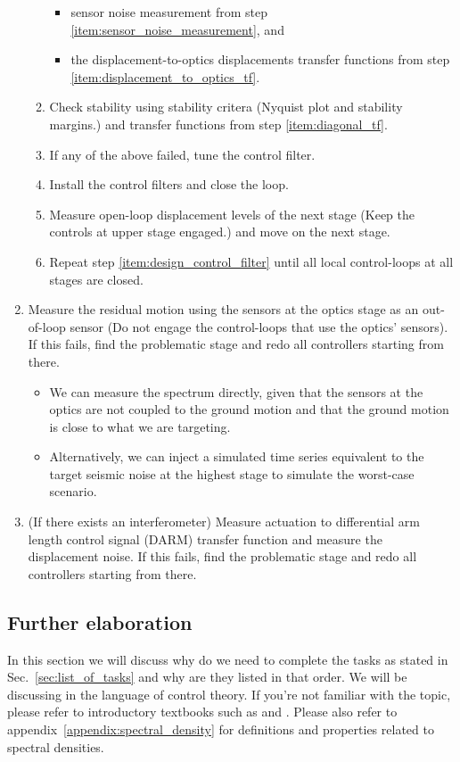 \begin{enumerate}
\begin{enumerate}
\begin{itemize}
			\item sensor noise measurement from step \ref{item:sensor_noise_measurement}, and
			\item the displacement-to-optics displacements transfer functions from step \ref{item:displacement_to_optics_tf}.
		\end{itemize} 
		\item Check stability using stability critera (Nyquist plot and stability margins.) and transfer functions from step \ref{item:diagonal_tf}.
		\item If any of the above failed, tune the control filter.
		\item Install the control filters and close the loop.
		\item Measure open-loop displacement levels of the next stage (Keep the controls at upper stage engaged.) and move on the next stage. \label{item:open_loop_displacement_levels}
		\item Repeat step \ref{item:design_control_filter} until all local control-loops at all stages are closed.
	\end{enumerate}
	\item Measure the residual motion using the sensors at the optics stage as an out-of-loop sensor (Do not engage the control-loops that use the optics' sensors). If this fails, find the problematic stage and redo all controllers starting from there.
		\begin{itemize}
			\item We can measure the spectrum directly, given that the sensors at the optics are not coupled to the ground motion and that the ground motion is close to what we are targeting.
			\item Alternatively, we can inject a simulated time series equivalent to the target seismic noise at the highest stage to simulate the worst-case scenario.
		\end{itemize}
	\item (If there exists an interferometer) Measure actuation to differential arm length control signal (DARM) transfer function and measure the displacement noise. If this fails, find the problematic stage and redo all controllers starting from there.
\end{enumerate}

\subsection{Further elaboration \label{sec:suspension_commissioning_tasks_further_elaboration}}
In this section we will discuss why do we need to complete the tasks as stated in Sec.~\ref{sec:list_of_tasks} and why are they listed in that order.
We will be discussing in the language of control theory.
If you're not familiar with the topic, please refer to introductory textbooks such as \cite{modern_control_engineering} and \cite{control_engineering}. Please also refer to appendix~\ref{appendix:spectral_density} for definitions and properties related to spectral densities.

